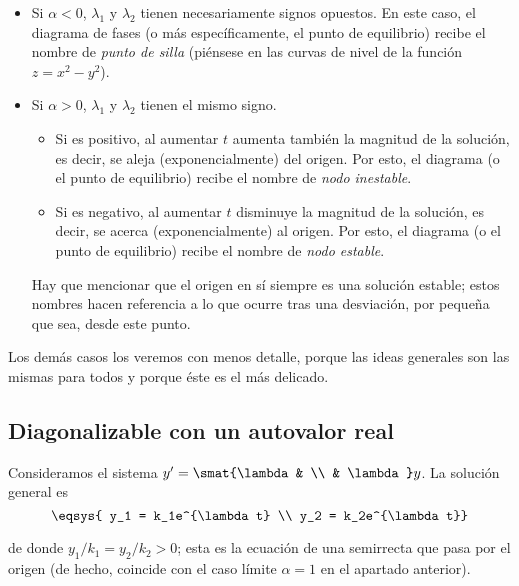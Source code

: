 \documentclass[../ecuaciones_diferenciales.tex]{subfiles}
\begin{document}
\begin{itemize}
	\item Si \(\alpha < 0\), \(\lambda_1\) y \(\lambda_2\) tienen necesariamente
	      signos opuestos. En este caso, el diagrama de fases (o más específicamente, el
	      punto de equilibrio) recibe el nombre de \emph{punto de silla} (piénsese en
		  las curvas de nivel de la función  
		  \(z = x^2 - y^2\)).

	\item Si \(\alpha > 0\), \(\lambda_1\) y \(\lambda_2\) tienen el mismo signo.
	      \begin{itemize}
		      \item Si es positivo, al aumentar \(t\) aumenta también la magnitud de la
		            solución, es decir, se aleja (exponencialmente) del origen. Por esto, el
		            diagrama (o el punto de equilibrio) recibe el nombre de \emph{nodo
			            inestable}.
		      \item Si es negativo, al aumentar \(t\) disminuye la magnitud de la solución,
		            es decir, se acerca (exponencialmente) al origen. Por esto, el diagrama (o
		            el punto de equilibrio) recibe el nombre de \emph{nodo estable}.
	      \end{itemize}
	      Hay que mencionar que el origen en sí siempre es una solución estable; estos
	      nombres hacen referencia a lo que ocurre tras una desviación, por pequeña que
	      sea, desde este punto.
\end{itemize}

Los demás casos los veremos con menos detalle, porque las ideas generales son
las mismas para todos y porque éste es el más delicado.

\subsection{Diagonalizable con un autovalor real}

Consideramos el sistema \(y' = \smat{\lambda & \\ & \lambda} y\). La solución
general es
\[\eqsys{
	y_1 = k_1e^{\lambda t} \\
	y_2 = k_2e^{\lambda t}}\]

de donde \(y_1/k_1 = y_2/k_2 > 0\); esta es la ecuación de una semirrecta que
pasa por el origen (de hecho, coincide con el caso límite \(\alpha = 1\) en el
apartado anterior).
\end{document}
